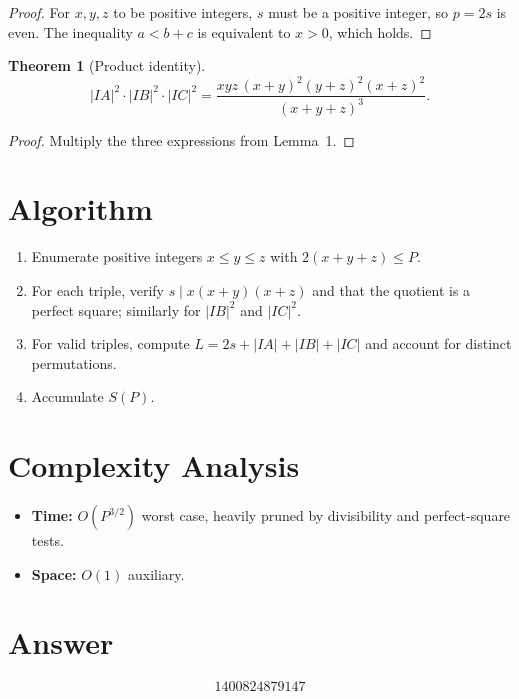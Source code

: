 \documentclass[12pt]{article}
\newtheorem{theorem}{Theorem}
\begin{document}
\begin{proof}
For $x,y,z$ to be positive integers, $s$ must be a positive integer, so $p=2s$ is even. The inequality $a < b+c$ is equivalent to $x > 0$, which holds.
\end{proof}

\begin{theorem}[Product identity]
\[
|IA|^2\cdot|IB|^2\cdot|IC|^2 = \frac{xyz\,(x+y)^2(y+z)^2(x+z)^2}{(x+y+z)^3}.
\]
\end{theorem}

\begin{proof}
Multiply the three expressions from Lemma~1.
\end{proof}

\section{Algorithm}
\begin{enumerate}
\item Enumerate positive integers $x \le y \le z$ with $2(x+y+z) \le P$.
\item For each triple, verify $s \mid x(x+y)(x+z)$ and that the quotient is a perfect square; similarly for $|IB|^2$ and $|IC|^2$.
\item For valid triples, compute $L = 2s + |IA| + |IB| + |IC|$ and account for distinct permutations.
\item Accumulate $S(P)$.
\end{enumerate}

\section{Complexity Analysis}
\begin{itemize}
\item \textbf{Time:} $O(P^{3/2})$ worst case, heavily pruned by divisibility and perfect-square tests.
\item \textbf{Space:} $O(1)$ auxiliary.
\end{itemize}

\section{Answer}

\[
\boxed{1400824879147}
\]
\end{document}
